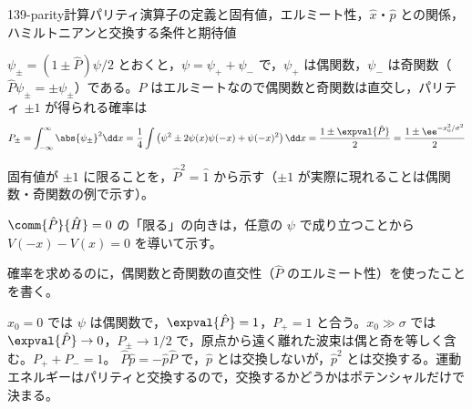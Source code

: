 \documentclass[uplatex,dvipdfmx,a4paper,11pt]{jsarticle}
\begin{document}
\begin{mondai}{139-parity}{計算}{パリティ演算子の定義と固有値，エルミート性，$\hat{x}$・$\hat{p}$ との関係，ハミルトニアンと交換する条件と期待値}
\begin{tadashii}
$\psi_{\pm}=(1\pm\hat{P})\psi/2$ とおくと，$\psi=\psi_{+}+\psi_{-}$ で，$\psi_{+}$ は偶関数，$\psi_{-}$ は奇関数（$\hat{P}\psi_{\pm}=\pm\psi_{\pm}$）である。$\hat{P}$ はエルミートなので偶関数と奇関数は直交し，パリティ $\pm1$ が得られる確率は
\[ P_{\pm}=\int_{-\infty}^{\infty}\abs{\psi_{\pm}}^{2}\dd x=\frac{1}{4}\int\left(\psi^{2}\pm2\psi(x)\psi(-x)+\psi(-x)^{2}\right)\dd x=\frac{1\pm\expval{\hat{P}}}{2}=\frac{1\pm\ee^{-x_{0}^{2}/\sigma^{2}}}{2} \]
\begin{ronten}
  \item {} 固有値が $\pm1$ に限ることを，$\hat{P}^{2}=\hat{1}$ から示す（$\pm1$ が実際に現れることは偶関数・奇関数の例で示す）。
  \item {} $\comm{\hat{P}}{\hat{H}}=0$ の「限る」の向きは，任意の $\psi$ で成り立つことから $V(-x)-V(x)=0$ を導いて示す。
  \item {} 確率を求めるのに，偶関数と奇関数の直交性（$\hat{P}$ のエルミート性）を使ったことを書く。
\end{ronten}
\kenzan $x_{0}=0$ では $\psi$ は偶関数で，$\expval{\hat{P}}=1$，$P_{+}=1$ と合う。$x_{0}\gg\sigma$ では $\expval{\hat{P}}\to0$，$P_{\pm}\to1/2$ で，原点から遠く離れた波束は偶と奇を等しく含む。$P_{+}+P_{-}=1$。
\tsumazuki $\hat{P}\hat{p}=-\hat{p}\hat{P}$ で，$\hat{p}$ とは交換しないが，$\hat{p}^{2}$ とは交換する。運動エネルギーはパリティと交換するので，交換するかどうかはポテンシャルだけで決まる。
\end{tadashii}
\end{mondai}
\end{document}
